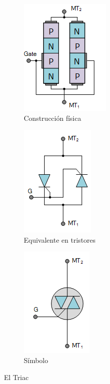 \begin{figure}[H]
	\centering
	\begin{subfigure}{0.3\linewidth}
		\centering
		\includegraphics{img/triac1.png}
		\caption{Construcción física}%
		\label{fig:triac-construction}
	\end{subfigure}
	\begin{subfigure}{0.3\linewidth}
		\centering
		\includegraphics{img/triac2.png}
		\caption{Equivalente en tristores}%
		\label{fig:triac-analogy}
	\end{subfigure}
	\begin{subfigure}{0.3\linewidth}
		\centering
		\includegraphics{img/triac3.png}
		\caption{Símbolo}%
		\label{fig:triac-symbol}
	\end{subfigure}
	\caption[Triac]{El Triac\footnotemark{}}%
		\label{fig:triac}
\end{figure}

